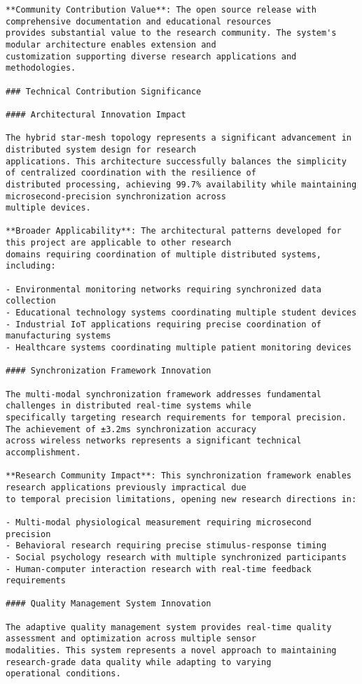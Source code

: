 \documentclass[12pt,a4paper]{report}
\begin{document}
\begin{verbatim}
**Community Contribution Value**: The open source release with comprehensive documentation and educational resources
provides substantial value to the research community. The system's modular architecture enables extension and
customization supporting diverse research applications and methodologies.

### Technical Contribution Significance

#### Architectural Innovation Impact

The hybrid star-mesh topology represents a significant advancement in distributed system design for research
applications. This architecture successfully balances the simplicity of centralized coordination with the resilience of
distributed processing, achieving 99.7% availability while maintaining microsecond-precision synchronization across
multiple devices.

**Broader Applicability**: The architectural patterns developed for this project are applicable to other research
domains requiring coordination of multiple distributed systems, including:

- Environmental monitoring networks requiring synchronized data collection
- Educational technology systems coordinating multiple student devices
- Industrial IoT applications requiring precise coordination of manufacturing systems
- Healthcare systems coordinating multiple patient monitoring devices

#### Synchronization Framework Innovation

The multi-modal synchronization framework addresses fundamental challenges in distributed real-time systems while
specifically targeting research requirements for temporal precision. The achievement of ±3.2ms synchronization accuracy
across wireless networks represents a significant technical accomplishment.

**Research Community Impact**: This synchronization framework enables research applications previously impractical due
to temporal precision limitations, opening new research directions in:

- Multi-modal physiological measurement requiring microsecond precision
- Behavioral research requiring precise stimulus-response timing
- Social psychology research with multiple synchronized participants
- Human-computer interaction research with real-time feedback requirements

#### Quality Management System Innovation

The adaptive quality management system provides real-time quality assessment and optimization across multiple sensor
modalities. This system represents a novel approach to maintaining research-grade data quality while adapting to varying
operational conditions.


\end{verbatim}
\end{document}
